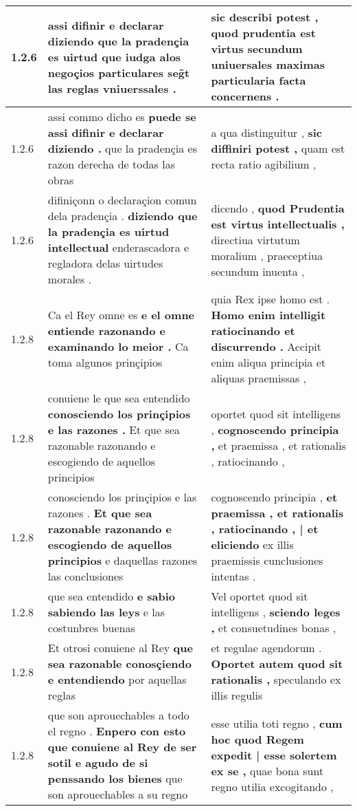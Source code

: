 \begin{tabular}{|p{1cm}|p{6.5cm}|p{6.5cm}|}
1.2.6 & assi difinir e declarar \textbf{ diziendo que la pradençia es uirtud } que iudga alos negoçios particulares seg̃t las reglas vniuerssales . & sic describi potest , \textbf{ quod prudentia est virtus } secundum uniuersales maximas particularia facta concernens . \\\hline
1.2.6 & assi commo dicho es \textbf{ puede se assi difinir e declarar diziendo . } que la pradençia es razon derecha de todas las obras & a qua distinguitur , \textbf{ sic diffiniri potest , } quam est recta ratio agibilium , \\\hline
1.2.6 & difiniçonn o declaraçion comun dela pradençia . \textbf{ diziendo que la pradençia es uirtud intellectual } enderascadora e regladora delas uirtudes morales . & dicendo , \textbf{ quod Prudentia est virtus intellectualis , } directiua virtutum moralium , praeceptiua secundum inuenta , \\\hline
1.2.8 & Ca el Rey omne es \textbf{ e el omne entiende razonando e examinando lo meior . } Ca toma algunos prinçipios & quia Rex ipse homo est . \textbf{ Homo enim intelligit ratiocinando et discurrendo . } Accipit enim aliqua principia et aliquas praemissas , \\\hline
1.2.8 & conuiene le que sea entendido \textbf{ conosciendo los prinçipios e las razones . } Et que sea razonable razonando e escogiendo de aquellos principios & oportet quod sit intelligens , \textbf{ cognoscendo principia , } et praemissa , et rationalis , ratiocinando , \\\hline
1.2.8 & conosciendo los prinçipios e las razones . \textbf{ Et que sea razonable razonando e escogiendo de aquellos principios } e daquellas razones las conclusiones & cognoscendo principia , \textbf{ et praemissa , et rationalis , ratiocinando , | et eliciendo } ex illis praemissis cunclusiones intentas . \\\hline
1.2.8 & que sea entendido \textbf{ e sabio sabiendo las leys } e las costunbres buenas & Vel oportet quod sit intelligens , \textbf{ sciendo leges , } et consuetudines bonas , \\\hline
1.2.8 & Et otrosi conuiene al Rey \textbf{ que sea razonable conosçiendo e entendiendo } por aquellas reglas & et regulae agendorum . \textbf{ Oportet autem quod sit rationalis , } speculando ex illis regulis \\\hline
1.2.8 & que son aprouechables a todo el regno . \textbf{ Enpero con esto que conuiene al Rey de ser sotil e agudo de si penssando los bienes } que son aprouechables a su regno & esse utilia toti regno , \textbf{ cum hoc quod Regem expedit | esse solertem ex se , } quae bona sunt regno utilia excogitando , \\\hline

\end{tabular}
